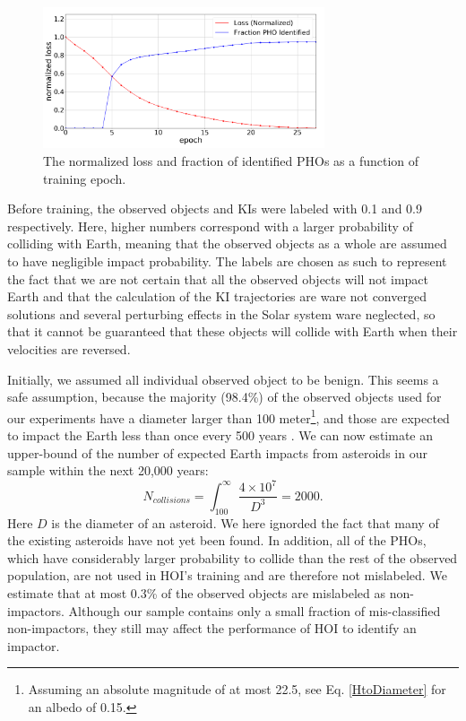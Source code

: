 \documentclass{aa}
\begin{document}
\begin{figure}[t]
	\hspace*{-0.3cm}
 	\includegraphics[width=83mm]{images/cost_epoch_pho.png}
	\centering
	\caption{\label{FIG:loss} The normalized loss and fraction of
          identified PHOs as a function of training epoch.}
\end{figure}

Before training, the observed objects and KIs were labeled with 0.1
and 0.9 respectively. Here, higher numbers correspond with a larger
probability of colliding with Earth, meaning that the observed objects
as a whole are assumed to have negligible impact probability.  The
labels are chosen as such to represent the fact that we are not
certain that all the observed objects will not impact Earth and that
the calculation of the KI trajectories are ware not converged
solutions \cite{2014ApJ...785L...3P} and several perturbing effects in
the Solar system ware neglected, so that it cannot be guaranteed that
these objects will collide with Earth when their velocities are
reversed.

Initially, we assumed all individual observed object to be benign.
This seems a safe assumption, because the majority (98.4\%) of the
observed objects used for our experiments have a diameter larger than
100 meter\footnote{ Assuming an absolute magnitude of at most 22.5,
  see Eq. \ref{HtoDiameter} for an albedo of 0.15.}, and those are
expected to impact the Earth less than once every 500 years
\citep{Bostrom}.  We can now estimate an upper-bound of the number of
expected Earth impacts from asteroids in our sample within the next
20,000 years:
\begin{equation}
    N_{collisions}=\int^{\infty}_{100}\frac{4\times10^7}{D^3}=2000.
\end{equation}
Here $D$ is the diameter of an asteroid.  We here ignorded the fact
that many of the existing asteroids have not yet been found.  In
addition, all of the PHOs, which have considerably larger probability
to collide than the rest of the observed population, are not used in
HOI's training and are therefore not mislabeled. We estimate that at
most 0.3\% of the observed objects are mislabeled as
non-impactors. Although our sample contains only a small fraction of
mis-classified non-impactors, they still may affect the performance of
HOI to identify an impactor.
\end{document}
